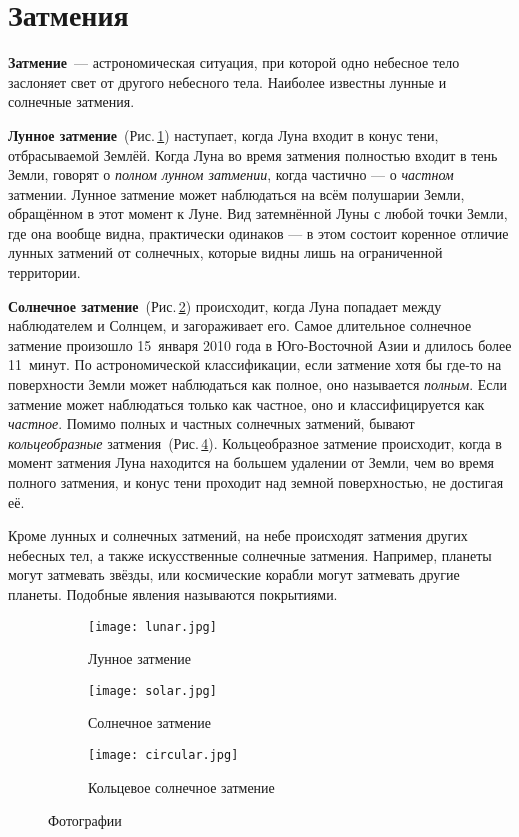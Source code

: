 \documentclass{article}
\begin{document}
\section{Затмения}
    \textbf{Затмение}~--- астрономическая ситуация, при которой одно небесное тело заслоняет свет от другого небесного тела. Наиболее известны лунные и солнечные затмения.\par
    \textbf{Лунное затмение}~(Рис.\,\ref{pic:lunar}) наступает, когда Луна входит в конус тени, отбрасываемой Землёй. Когда Луна во время затмения полностью входит в тень Земли, говорят о \textit{полном лунном затмении}, когда частично — о \textit{частном} затмении. Лунное затмение может наблюдаться на всём полушарии Земли, обращённом в этот момент к Луне. Вид затемнённой Луны с любой точки Земли, где она вообще видна, практически одинаков — в этом состоит коренное отличие лунных затмений от солнечных, которые видны лишь на ограниченной территории.\par
    \textbf{Солнечное затмение}~(Рис.\,\ref{pic:solar}) происходит, когда Луна попадает между наблюдателем и Солнцем, и загораживает его. Самое длительное солнечное затмение произошло 15~января 2010 года в Юго-Восточной Азии и длилось более 11~минут. По астрономической классификации, если затмение хотя бы где-то на поверхности Земли может наблюдаться как полное, оно называется \textit{полным}. Если затмение может наблюдаться только как частное, оно и классифицируется как \textit{частное}. Помимо полных и частных солнечных затмений, бывают \textit{кольцеобразные} затмения~(Рис.\,\ref{pic:circ}). Кольцеобразное затмение происходит, когда в момент затмения Луна находится на большем удалении от Земли, чем во время полного затмения, и конус тени проходит над земной поверхностью, не достигая её.\par
    Кроме лунных и солнечных затмений, на небе происходят затмения других небесных тел, а также искусственные солнечные затмения. Например, планеты могут затмевать звёзды, или космические корабли могут затмевать другие планеты. Подобные явления называются покрытиями.
	\begin{figure}[p]
		\centering
		\begin{subfigure}[b]{0.7\textwidth}
			\centering
			\texttt{[image: lunar.jpg]}
			\caption{Лунное затмение}
			\label{pic:lunar}
		\end{subfigure}
		\begin{subfigure}[b]{0.7\textwidth}
			\centering
			\texttt{[image: solar.jpg]}
			\caption{Солнечное затмение}
			\label{pic:solar}
		\end{subfigure}
		\begin{subfigure}[b]{0.7\textwidth}
			\centering
			\texttt{[image: circular.jpg]}
			\caption{Кольцевое солнечное затмение}
			\label{pic:circ}
		\end{subfigure}
		\caption{Фотографии}
	\end{figure}	
\end{document}
